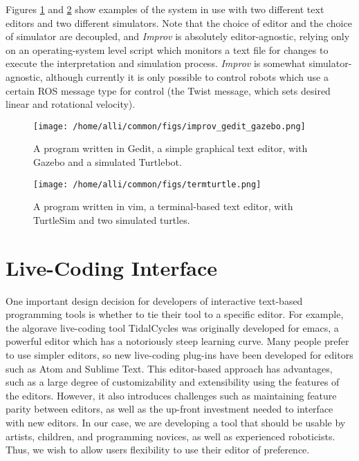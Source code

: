 \documentclass[sigconf]{acmart}
\begin{document}
Figures \ref{gedit} and \ref{vim} show examples of the system in use with two
different text editors and two different simulators. Note that the choice of
editor and the choice of simulator are decoupled, and \emph{Improv} is
absolutely editor-agnostic, relying only on an operating-system level script
which monitors a text file for changes to execute the interpretation and
simulation process. \emph{Improv} is somewhat simulator-agnostic, although
currently it is only possible to control robots which use a certain ROS message
type for control (the Twist message, which sets desired linear and rotational
velocity).

\begin{figure}[h]
\centering
\texttt{[image: /home/alli/common/figs/improv\_gedit\_gazebo.png]}
\caption{A program written in Gedit, a simple graphical text editor, with Gazebo and a simulated
Turtlebot.\label{gedit}}
\end{figure}

\begin{figure}[h]
\centering
\texttt{[image: /home/alli/common/figs/termturtle.png]}
\caption{A program written in vim, a terminal-based text editor, with TurtleSim and two
simulated turtles.\label{vim}}
\end{figure}

\section{Live-Coding Interface}\label{live-coding-interface}

One important design decision for developers of interactive text-based
programming tools is whether to tie their tool to a specific editor. For
example, the algorave live-coding tool TidalCycles was originally
developed for emacs, a powerful editor which has a notoriously steep
learning curve. Many people prefer to use simpler editors, so new
live-coding plug-ins have been developed for editors such as Atom and
Sublime Text. This editor-based approach has advantages, such as a large
degree of customizability and extensibility using the features of the
editors. However, it also introduces challenges such as maintaining
feature parity between editors, as well as the up-front investment
needed to interface with new editors. In our case, we are developing a
tool that should be usable by artists, children, and programming
novices, as well as experienced roboticists. Thus, we wish to allow
users flexibility to use their editor of preference.
\end{document}
